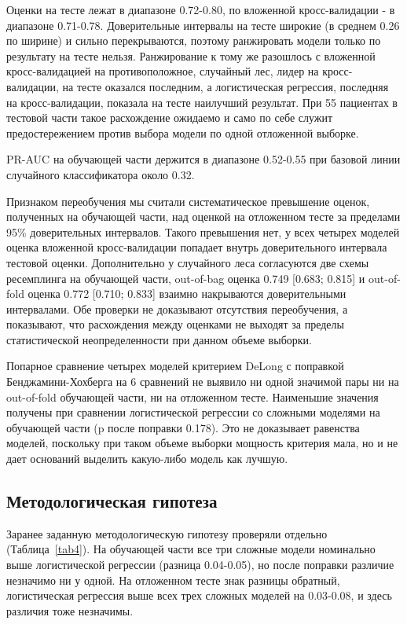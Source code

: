 \documentclass[pdflatex,sn-basic,Numbered]{sn-jnl}
\begin{document}
Оценки на тесте лежат в диапазоне 0.72-0.80, по вложенной кросс-валидации - в диапазоне 0.71-0.78. Доверительные интервалы на тесте широкие (в среднем 0.26 по ширине) и сильно перекрываются, поэтому ранжировать модели только по результату на тесте нельзя. Ранжирование к тому же разошлось с вложенной кросс-валидацией на противоположное, случайный лес, лидер на кросс-валидации, на тесте оказался последним, а логистическая регрессия, последняя на кросс-валидации, показала на тесте наилучший результат. При 55 пациентах в тестовой части такое расхождение ожидаемо и само по себе служит предостережением против выбора модели по одной отложенной выборке.

PR-AUC на обучающей части держится в диапазоне 0.52-0.55 при базовой линии случайного классификатора около 0.32.

Признаком переобучения мы считали систематическое превышение оценок, полученных на обучающей части, над оценкой на отложенном тесте за пределами 95\% доверительных интервалов. Такого превышения нет, у всех четырех моделей оценка вложенной кросс-валидации попадает внутрь доверительного интервала тестовой оценки. Дополнительно у случайного леса согласуются две схемы ресемплинга на обучающей части, out-of-bag оценка 0.749 [0.683; 0.815] и out-of-fold оценка 0.772 [0.710; 0.833] взаимно накрываются доверительными интервалами. Обе проверки не доказывают отсутствия переобучения, а показывают, что расхождения между оценками не выходят за пределы статистической неопределенности при данном объеме выборки.

Попарное сравнение четырех моделей критерием DeLong с поправкой Бенджамини-Хохберга на 6 сравнений не выявило ни одной значимой пары ни на out-of-fold обучающей части, ни на отложенном тесте. Наименьшие значения получены при сравнении логистической регрессии со сложными моделями на обучающей части (p после поправки 0.178). Это не доказывает равенства моделей, поскольку при таком объеме выборки мощность критерия мала, но и не дает оснований выделить какую-либо модель как лучшую.

\subsection{Методологическая гипотеза}\label{subsec3_4}

Заранее заданную методологическую гипотезу проверяли отдельно (Таблица~\ref{tab4}). На обучающей части все три сложные модели номинально выше логистической регрессии (разница 0.04-0.05), но после поправки различие незначимо ни у одной. На отложенном тесте знак разницы обратный, логистическая регрессия выше всех трех сложных моделей на 0.03-0.08, и здесь различия тоже незначимы.
\end{document}
